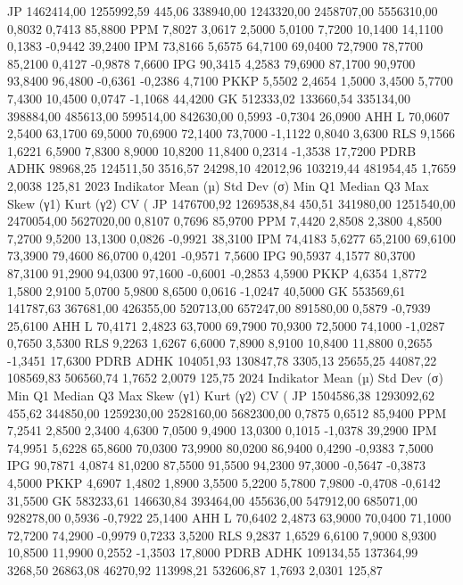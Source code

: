 JP 1462414,00 1255992,59 445,06 338940,00 1243320,00 2458707,00 5556310,00 0,8032 0,7413 85,8800 PPM 7,8027 3,0617 2,5000 5,0100 7,7200 10,1400 14,1100 0,1383 -0,9442 39,2400
IPM 73,8166 5,6575 64,7100 69,0400 72,7900 78,7700 85,2100 0,4127 -0,9878 7,6600
IPG 90,3415 4,2583 79,6900 87,1700 90,9700 93,8400 96,4800 -0,6361 -0,2386 4,7100 PKKP 5,5502 2,4654 1,5000 3,4500 5,7700 7,4300 10,4500 0,0747 -1,1068 44,4200 GK 512333,02 133660,54 335134,00 398884,00 485613,00 599514,00 842630,00 0,5993 -0,7304 26,0900 AHH L 70,0607 2,5400 63,1700 69,5000 70,6900 72,1400 73,7000 -1,1122 0,8040 3,6300 RLS 9,1566 1,6221 6,5900 7,8300 8,9000 10,8200 11,8400 0,2314 -1,3538 17,7200 PDRB ADHK 98968,25 124511,50 3516,57 24298,10 42012,96 103219,44 481954,45 1,7659 2,0038 125,81
2023
Indikator Mean (µ) Std Dev (σ) Min Q1 Median Q3 Max Skew (γ1) Kurt (γ2) CV (%
JP 1476700,92 1269538,84 450,51 341980,00 1251540,00 2470054,00 5627020,00 0,8107 0,7696 85,9700 PPM 7,4420 2,8508 2,3800 4,8500 7,2700 9,5200 13,1300 0,0826 -0,9921 38,3100
IPM 74,4183 5,6277 65,2100 69,6100 73,3900 79,4600 86,0700 0,4201 -0,9571 7,5600
IPG 90,5937 4,1577 80,3700 87,3100 91,2900 94,0300 97,1600 -0,6001 -0,2853 4,5900 PKKP 4,6354 1,8772 1,5800 2,9100 5,0700 5,9800 8,6500 0,0616 -1,0247 40,5000 GK 553569,61 141787,63 367681,00 426355,00 520713,00 657247,00 891580,00 0,5879 -0,7939 25,6100 AHH L 70,4171 2,4823 63,7000 69,7900 70,9300 72,5000 74,1000 -1,0287 0,7650 3,5300 RLS 9,2263 1,6267 6,6000 7,8900 8,9100 10,8400 11,8800 0,2655 -1,3451 17,6300 PDRB ADHK 104051,93 130847,78 3305,13 25655,25 44087,22 108569,83 506560,74 1,7652 2,0079 125,75
2024
Indikator Mean (µ) Std Dev (σ) Min Q1 Median Q3 Max Skew (γ1) Kurt (γ2) CV (%
JP 1504586,38 1293092,62 455,62 344850,00 1259230,00 2528160,00 5682300,00 0,7875 0,6512 85,9400 PPM 7,2541 2,8500 2,3400 4,6300 7,0500 9,4900 13,0300 0,1015 -1,0378 39,2900
IPM 74,9951 5,6228 65,8600 70,0300 73,9900 80,0200 86,9400 0,4290 -0,9383 7,5000
IPG 90,7871 4,0874 81,0200 87,5500 91,5500 94,2300 97,3000 -0,5647 -0,3873 4,5000 PKKP 4,6907 1,4802 1,8900 3,5500 5,2200 5,7800 7,9800 -0,4708 -0,6142 31,5500 GK 583233,61 146630,84 393464,00 455636,00 547912,00 685071,00 928278,00 0,5936 -0,7922 25,1400 AHH L 70,6402 2,4873 63,9000 70,0400 71,1000 72,7200 74,2900 -0,9979 0,7233 3,5200 RLS 9,2837 1,6529 6,6100 7,9000 8,9300 10,8500 11,9900 0,2552 -1,3503 17,8000 PDRB ADHK 109134,55 137364,99 3268,50 26863,08 46270,92 113998,21 532606,87 1,7693 2,0301 125,87
